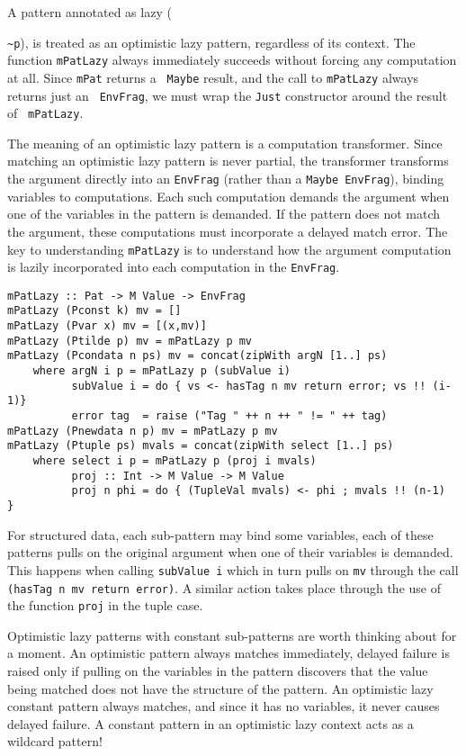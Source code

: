 \documentclass{entcs} \usepackage{entcsmacro}
\begin{document}
A pattern annotated as lazy ({\verb+~p+), is treated as an optimistic lazy
pattern, regardless of its context. The function {\tt mPatLazy} always immediately
succeeds without forcing any computation at all. Since {\tt mPat} returns a {\tt
Maybe} result, and the call to {\tt mPatLazy} always returns just an {\tt
EnvFrag}, we must wrap the {\tt Just} constructor around the result of {\tt
mPatLazy}.

The meaning of an optimistic lazy pattern is a computation transformer. Since
matching an optimistic lazy pattern is never partial, the transformer transforms
the argument directly into an {\tt EnvFrag} (rather than a {\tt Maybe EnvFrag}),
binding variables to computations. Each such computation demands the argument when
one of the variables in the pattern is demanded. If the pattern does not match the
argument, these computations must incorporate a delayed match error. The key to
understanding {\tt mPatLazy} is to understand how the argument computation is
lazily incorporated into each computation in the {\tt EnvFrag}.


{\small
\begin{verbatim}
mPatLazy :: Pat -> M Value -> EnvFrag
mPatLazy (Pconst k) mv = []         
mPatLazy (Pvar x) mv = [(x,mv)]
mPatLazy (Ptilde p) mv = mPatLazy p mv
mPatLazy (Pcondata n ps) mv = concat(zipWith argN [1..] ps)
    where argN i p = mPatLazy p (subValue i)
          subValue i = do { vs <- hasTag n mv return error; vs !! (i-1)}
          error tag  = raise ("Tag " ++ n ++ " != " ++ tag)
mPatLazy (Pnewdata n p) mv = mPatLazy p mv                    
mPatLazy (Ptuple ps) mvals = concat(zipWith select [1..] ps)
    where select i p = mPatLazy p (proj i mvals)
          proj :: Int -> M Value -> M Value
          proj n phi = do { (TupleVal mvals) <- phi ; mvals !! (n-1)  } 
\end{verbatim}
}

For structured data, each sub-pattern may bind some variables, each of these patterns
pulls on the original argument when one of their variables is demanded. This happens
when calling {\tt subValue i} which in turn pulls on {\tt mv} through the call 
\verb+(hasTag n mv return error)+. A similar action takes place through the use of
the function {\tt proj} in the tuple case.

Optimistic lazy patterns with constant sub-patterns are worth thinking about
for a moment. An optimistic pattern always matches immediately, delayed
failure is raised only if pulling on the variables in the pattern discovers
that the value being matched does not have the structure of the pattern. An
optimistic lazy constant pattern always matches, and since it has no
variables, it never causes delayed failure. A constant pattern in an
optimistic lazy context acts as a wildcard pattern!

}
\end{document}
